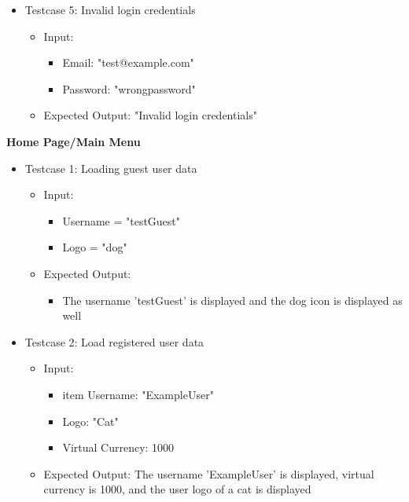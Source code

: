 \begin{itemize}
    \item Testcase 5: Invalid login credentials
    \begin{itemize}
        \item Input:
            \begin{itemize}
                \item Email: "test@example.com"
                \item Password: "wrongpassword"
            \end{itemize}
        \item Expected Output: "Invalid login credentials"
    \end{itemize}
\end{itemize}

\noindent
\textbf{Home Page/Main Menu}
\begin{itemize}
    \item Testcase 1: Loading guest user data
    \begin{itemize}
        \item Input: 
            \begin{itemize}
                \item Username = "testGuest"
                \item Logo = "dog"
            \end{itemize}
        \item Expected Output: 
            \begin{itemize}
                \item The username 'testGuest' is displayed and the dog icon is displayed as well
            \end{itemize}
    \end{itemize}
    
    \item Testcase 2: Load registered user data
    \begin{itemize}
        \item Input:
            \begin{itemize}
                \item item Username: "ExampleUser"
                \item Logo: "Cat"
                \item Virtual Currency: 1000
            \end{itemize}
        \item Expected Output: The username 'ExampleUser' is displayed, virtual currency is 1000, and the user logo of a cat is displayed
    \end{itemize}


\end{itemize}
